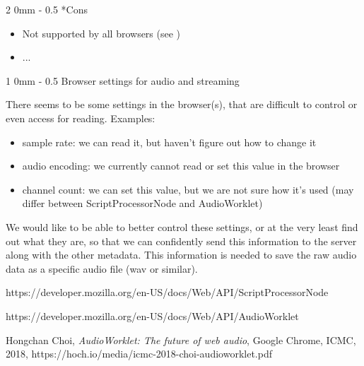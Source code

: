 \documentclass[11pt, a4paper, twoside]{article}
\makeatletter
\renewcommand{\subsection}{\@startsection
   {subsection}%
   {2}%
   {0mm}%
   {-\baselineskip}%
   {0.5\baselineskip}%
   {\bfseries\sffamily\large}}%
\renewcommand{\section}{\@startsection
   {section}%
   {1}%
   {0mm}%
   {-\baselineskip}%
   {0.5\baselineskip}%
   {\bfseries\sffamily\Large}}%
\makeatother
\begin{document}
\subsection*{Cons}
\begin{itemize}
\item Not supported by all browsers (see \cite{audioworklet})
\item ...
\end{itemize}




\section{Browser settings for audio and streaming}

There seems to be some settings in the browser(s), that are difficult to control or even access for reading. Examples:

\begin{itemize}
\item sample rate: we can read it, but haven't figure out how to change it
\item audio encoding: we currently cannot read or set this value in the browser
\item channel count: we can set this value, but we are not sure how it's used (may differ between ScriptProcessorNode and AudioWorklet)
\end{itemize}

We would like to be able to better control these settings, or at the very least find out what they are, so that we can confidently send this information to the server along with the other metadata. This information is needed to save the raw audio data as a specific audio file (wav or similar).


\begin{thebibliography}{9}

  https://developer.mozilla.org/en-US/docs/Web/API/ScriptProcessorNode

https://developer.mozilla.org/en-US/docs/Web/API/AudioWorklet

  Hongchan Choi,
    \textit{AudioWorklet: The future of web audio},
    Google Chrome,
    ICMC,
    2018,
    https://hoch.io/media/icmc-2018-choi-audioworklet.pdf

\end{thebibliography}
\end{document}
